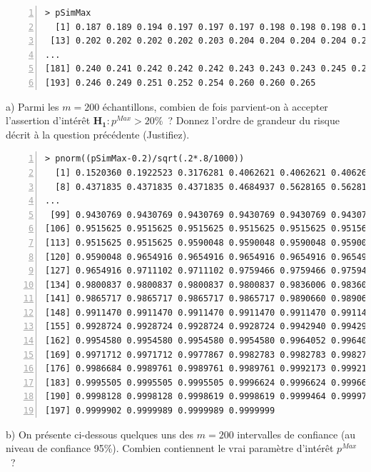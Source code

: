 \documentclass[10pt]{report}
\begin{document}
\begin{exercice}
\begin{Verbatim}[frame=leftline,fontfamily=tt,fontshape=n,numbers=left]
> pSimMax
  [1] 0.187 0.189 0.194 0.197 0.197 0.197 0.198 0.198 0.198 0.198 0.199 0.202
 [13] 0.202 0.202 0.202 0.202 0.203 0.204 0.204 0.204 0.204 0.204 0.205 0.205
...
[181] 0.240 0.241 0.242 0.242 0.242 0.243 0.243 0.243 0.245 0.245 0.245 0.246
[193] 0.246 0.249 0.251 0.252 0.254 0.260 0.260 0.265
\end{Verbatim}


a)  
Parmi les $m=200$ échantillons, combien de fois parvient-on à accepter l'assertion d'intérêt $\mathbf{H_1}: p^{Max}>20\%$~? Donnez l'ordre de grandeur du risque décrit à la question précédente (Justifiez).

\begin{Verbatim}[frame=leftline,fontfamily=tt,fontshape=n,numbers=left]
> pnorm((pSimMax-0.2)/sqrt(.2*.8/1000))
  [1] 0.1520360 0.1922523 0.3176281 0.4062621 0.4062621 0.4062621 0.4371835
  [8] 0.4371835 0.4371835 0.4371835 0.4684937 0.5628165 0.5628165 0.5628165
...
 [99] 0.9430769 0.9430769 0.9430769 0.9430769 0.9430769 0.9430769 0.9430769
[106] 0.9515625 0.9515625 0.9515625 0.9515625 0.9515625 0.9515625 0.9515625
[113] 0.9515625 0.9515625 0.9590048 0.9590048 0.9590048 0.9590048 0.9590048
[120] 0.9590048 0.9654916 0.9654916 0.9654916 0.9654916 0.9654916 0.9654916
[127] 0.9654916 0.9711102 0.9711102 0.9759466 0.9759466 0.9759466 0.9800837
[134] 0.9800837 0.9800837 0.9800837 0.9800837 0.9836006 0.9836006 0.9836006
[141] 0.9865717 0.9865717 0.9865717 0.9865717 0.9890660 0.9890660 0.9911470
[148] 0.9911470 0.9911470 0.9911470 0.9911470 0.9911470 0.9911470 0.9911470
[155] 0.9928724 0.9928724 0.9928724 0.9928724 0.9942940 0.9942940 0.9954580
[162] 0.9954580 0.9954580 0.9954580 0.9954580 0.9964052 0.9964052 0.9964052
[169] 0.9971712 0.9971712 0.9977867 0.9982783 0.9982783 0.9982783 0.9986684
[176] 0.9986684 0.9989761 0.9989761 0.9989761 0.9992173 0.9992173 0.9994051
[183] 0.9995505 0.9995505 0.9995505 0.9996624 0.9996624 0.9996624 0.9998128
[190] 0.9998128 0.9998128 0.9998619 0.9998619 0.9999464 0.9999723 0.9999803
[197] 0.9999902 0.9999989 0.9999989 0.9999999
\end{Verbatim}




b) 
On présente ci-dessous quelques uns des $m=200$ intervalles de confiance (au niveau de confiance 95\%). Combien contiennent le vrai paramètre d'intérêt $p^{Max}$~?


\end{exercice}
\end{document}
